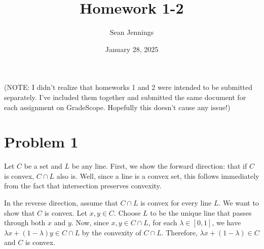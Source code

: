 \documentclass{homework}
\title{Homework 1-2}
\author{Sean Jennings}
\date{January 28, 2025}
\begin{document}
\maketitle

(NOTE: I didn't realize that homeworks 1 and 2 were intended to be submitted separately. I've included them together
and submitted the same document for each assignment on GradeScope. Hopefully this doesn't cause any issue!)

\section{Problem 1}
Let $C$ be a set and $L$ be any line. First, we show the forward direction:
that if $C$ is convex, $C \cap L$ also is. Well, since a line is a convex
set, this follows immediately from the fact that intersection preserves
convexity.

In the reverse direction, assume that $C \cap L$ is convex for every line $L$. We want
to show that $C$ is convex. Let $x,y\in C$. Choose $L$ to be the unique line that
passes through both $x$ and $y$. Now, since $x, y \in C \cap L$, for each $\lambda \in [0,1]$,
we have $\lambda x + (1 - \lambda) y \in C \cap L$ by the convexity of $C \cap L$. 
Therefore, $\lambda x + (1 - \lambda) \in C$  and $C$ is convex.
\end{document}
